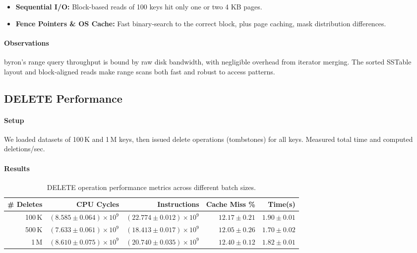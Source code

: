 \documentclass[10pt]{article}
\begin{document}
\begin{itemize}[itemsep=0.5ex]
  \item \textbf{Sequential I/O:} Block-based reads of 100 keys hit only one or two 4 KB pages.
  \item \textbf{Fence Pointers \& OS Cache:} Fast binary‐search to the correct block, plus page caching, mask distribution differences.
\end{itemize}

\paragraph{Observations}
byron’s range query throughput is bound by raw disk bandwidth, with negligible overhead from iterator merging. The sorted SSTable layout and block‐aligned reads make range scans both fast and robust to access patterns.

\subsection{DELETE Performance}

\paragraph{Setup}
We loaded datasets of 100\,K and 1\,M keys, then issued delete operations (tombstones) for all keys. Measured total time and computed deletions/sec.

\paragraph{Results}
\begin{table}[htbp]
  \centering
  \small
  \begin{tabular}{r r r r r}
    \toprule
    \# Deletes  & CPU Cycles                         & Instructions                             & Cache Miss \% & Time(s)             \\
    \midrule
    100\,K      & $(8.585\pm0.064)\times10^{9}$      & $(22.774\pm0.012)\times10^{9}$           & $12.17\pm0.21$ & $1.90\pm0.01$      \\
    500\,K      & $(7.633\pm0.061)\times10^{9}$      & $(18.413\pm0.017)\times10^{9}$           & $12.05\pm0.26$ & $1.70\pm0.02$      \\
    1\,M        & $(8.610\pm0.075)\times10^{9}$      & $(20.740\pm0.035)\times10^{9}$           & $12.40\pm0.12$ & $1.82\pm0.01$      \\
    \bottomrule
  \end{tabular}
  \caption{DELETE operation performance metrics across different batch sizes.}
  \label{tab:delete_perf_full}
\end{table}
\end{document}
